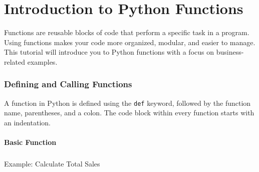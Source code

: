 \documentclass[
  letterpaper,
  DIV=11,
  numbers=noendperiod]{scrreprt}
\makeatletter
\let\oldparagraph\paragraph
\renewcommand{\paragraph}{
    \@ifstar
      \xxxParagraphStar
      \xxxParagraphNoStar
  }
\newcommand{\xxxParagraphStar}[1]{\oldparagraph*{#1}\mbox{}}
\newcommand{\xxxParagraphNoStar}[1]{\oldparagraph{#1}\mbox{}}
\newenvironment{Shaded}{\begin{snugshade}}{\end{snugshade}}
\newcommand{\BuiltInTok}[1]{\textcolor[rgb]{0.00,0.23,0.31}{#1}}
\newcommand{\CommentTok}[1]{\textcolor[rgb]{0.37,0.37,0.37}{#1}}
\newcommand{\ControlFlowTok}[1]{\textcolor[rgb]{0.00,0.23,0.31}{\textbf{#1}}}
\newcommand{\DecValTok}[1]{\textcolor[rgb]{0.68,0.00,0.00}{#1}}
\newcommand{\KeywordTok}[1]{\textcolor[rgb]{0.00,0.23,0.31}{\textbf{#1}}}
\newcommand{\NormalTok}[1]{\textcolor[rgb]{0.00,0.23,0.31}{#1}}
\newcommand{\OperatorTok}[1]{\textcolor[rgb]{0.37,0.37,0.37}{#1}}
\newcommand{\SpecialCharTok}[1]{\textcolor[rgb]{0.37,0.37,0.37}{#1}}
\newcommand{\SpecialStringTok}[1]{\textcolor[rgb]{0.13,0.47,0.30}{#1}}
\makeatother
\begin{document}

\chapter{Introduction to Python
Functions}\label{introduction-to-python-functions}

Functions are reusable blocks of code that perform a specific task in a
program. Using functions makes your code more organized, modular, and
easier to manage. This tutorial will introduce you to Python functions
with a focus on business-related examples.

\subsection{Defining and Calling
Functions}\label{defining-and-calling-functions-1}

A function in Python is defined using the \texttt{def} keyword, followed
by the function name, parentheses, and a colon. The code block within
every function starts with an indentation.

\subsubsection{Basic Function}\label{basic-function}

\paragraph{Example: Calculate Total
Sales}\label{example-calculate-total-sales}

\begin{Shaded}
\end{Shaded}
\end{document}

